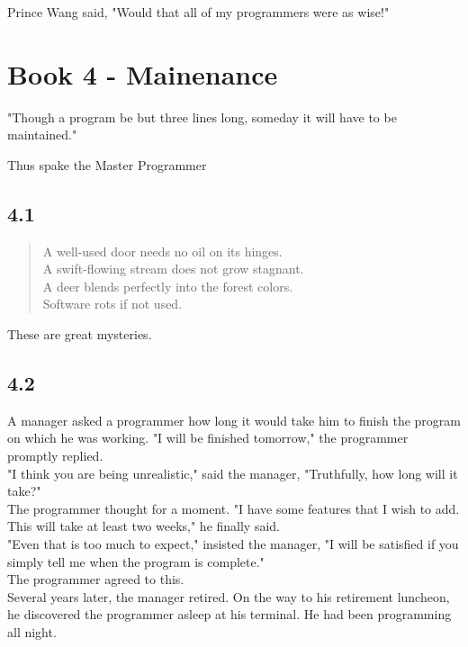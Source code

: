 \documentclass[14pt, letterpaper]{book}
\begin{document}
Prince Wang said, "Would that all of my programmers were as wise!"\\

\chapter*{Book 4 - Mainenance}
\epigraph{"Though a program be but three lines long, someday it will have to be maintained."}{Thus spake the Master Programmer}

\section*{4.1}
\begin{verse}
    A well-used door needs no oil on its hinges. \\
    A swift-flowing stream does not grow stagnant. \\
    A deer blends perfectly into the forest colors. \\
    Software rots if not used.\\
\end{verse}

These are great mysteries.    
\section*{4.2}
A manager asked a programmer how long it would take him to finish the program on which he was working. "I will be finished tomorrow," the programmer promptly replied.\\

"I think you are being unrealistic," said the manager, "Truthfully, how long will it take?"\\

The programmer thought for a moment. "I have some features that I wish to add. This will take at least two weeks," he finally said.\\

"Even that is too much to expect," insisted the manager, "I will be satisfied if you simply tell me when the program is complete."\\

The programmer agreed to this.\\

Several years later, the manager retired. On the way to his retirement luncheon, he discovered the programmer asleep at his terminal. He had been programming all night.\\
\end{document}
